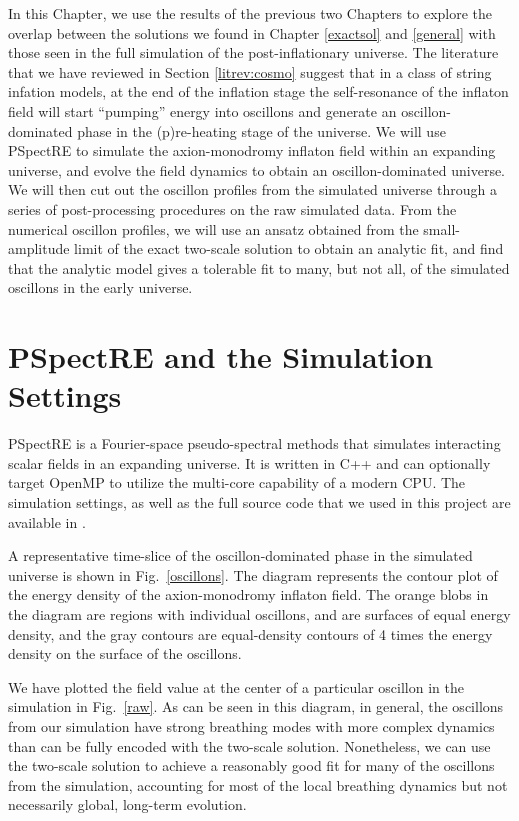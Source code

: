 \documentclass[11pt]{book}
\begin{document}
In this Chapter, we use the results of the previous two Chapters to explore the overlap between the solutions we found in Chapter \ref{exactsol} and \ref{general} with those seen in the full simulation of the post-inflationary universe. The literature that we have reviewed in Section \ref{litrev:cosmo} suggest that in a class of string infation models, at the end of the inflation stage the self-resonance of the inflaton field will start ``pumping'' energy into oscillons and generate an oscillon-dominated phase in the (p)re-heating stage of the universe. We will use PSpectRE \cite{Easther:2010qz} to simulate the axion-monodromy inflaton field within an expanding universe, and evolve the field dynamics to obtain an oscillon-dominated universe. We will then cut out the oscillon profiles from the simulated universe through a series of post-processing procedures on the raw simulated data. From the numerical oscillon profiles, we will use an ansatz obtained from the small-amplitude limit of the exact two-scale solution to obtain an analytic fit, and find that the analytic model gives a tolerable fit to many, but not all, of the simulated oscillons in the early universe.

\section{PSpectRE and the Simulation Settings}
PSpectRE \cite{Easther:2010qz} is a Fourier-space pseudo-spectral methods that simulates interacting scalar fields in an expanding universe. It is written in C++ and can optionally target OpenMP to utilize the multi-core capability of a modern CPU. The simulation settings, as well as the full source code that we used in this project are available in \cite{pspectregh}.

A representative time-slice of the oscillon-dominated phase in the simulated universe is shown in Fig.~\ref{oscillons}. The diagram represents the contour plot of the energy density of the axion-monodromy inflaton field. The orange blobs in the diagram are regions with individual oscillons, and are surfaces of equal energy density, and the gray contours are equal-density contours of 4 times the energy density on the surface of the oscillons.

We have plotted the field value at the center of a particular oscillon in the simulation in Fig.~\ref{raw}. As can be seen in this diagram, in general, the oscillons from our simulation have strong breathing modes with more complex dynamics than can be fully encoded with the two-scale solution. Nonetheless, we can use the two-scale solution to achieve a reasonably good fit for many of the oscillons from the simulation, accounting for most of the local breathing dynamics but not necessarily global, long-term evolution.
\end{document}
